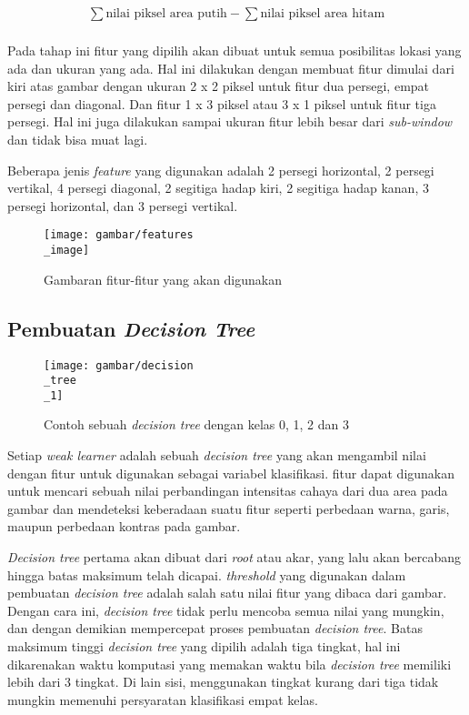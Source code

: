 \begin{equation}
  \begin{split}
    \sum \text{nilai piksel area putih} -  \sum \text{nilai piksel area hitam} \\ 
  \end{split}
\end{equation}

Pada tahap ini fitur yang dipilih akan dibuat untuk semua 
posibilitas lokasi yang ada dan ukuran yang ada. Hal ini dilakukan dengan 
membuat fitur dimulai dari kiri atas gambar dengan ukuran 2 x 2 piksel untuk fitur 
dua persegi, empat persegi dan diagonal. Dan fitur 1 x 3 piksel atau 3 x 1 piksel untuk 
fitur tiga persegi. Hal ini juga dilakukan sampai ukuran fitur lebih besar 
dari \emph{sub-window} dan tidak bisa muat lagi.

Beberapa jenis \textit{feature} yang digunakan adalah 2 persegi horizontal, 
2 persegi vertikal, 4 persegi diagonal, 2 segitiga hadap kiri, 2 segitiga hadap kanan, 
3 persegi horizontal, dan 3 persegi vertikal.

\begin{figure}[H]
  \centering{}
	\texttt{[image: gambar/features\\\_image]}
  \caption{Gambaran fitur-fitur yang akan digunakan}
\end{figure} 

\subsection{Pembuatan \textit{Decision Tree}}

\begin{figure}[H]
  \centering{}
	\texttt{[image: gambar/decision\\\_tree\\\_1]}
  \caption{Contoh sebuah \textit{decision tree} dengan kelas 0, 1, 2 dan 3}
\end{figure} 

Setiap \emph{weak learner} adalah sebuah \emph{decision tree} yang akan mengambil nilai 
dengan fitur untuk digunakan sebagai variabel klasifikasi.
fitur dapat digunakan untuk mencari 
sebuah nilai perbandingan intensitas cahaya dari dua area pada gambar dan 
mendeteksi keberadaan suatu fitur seperti 
perbedaan warna, garis, maupun perbedaan kontras pada gambar.

\textit{Decision tree} pertama akan dibuat dari \textit{root} atau akar, yang lalu 
akan bercabang hingga batas maksimum telah dicapai. \textit{threshold} yang digunakan 
dalam pembuatan \textit{decision tree} adalah salah satu nilai fitur yang dibaca dari gambar. 
Dengan cara ini, \textit{decision tree} tidak perlu mencoba semua nilai yang mungkin, dan 
dengan demikian mempercepat proses pembuatan \textit{decision tree}.
Batas maksimum tinggi \textit{decision tree }yang dipilih adalah tiga 
tingkat, hal ini dikarenakan waktu komputasi yang memakan waktu bila \textit{decision tree} 
memiliki lebih dari 3 tingkat. Di lain sisi, menggunakan tingkat kurang dari tiga tidak mungkin 
memenuhi persyaratan klasifikasi empat kelas.

